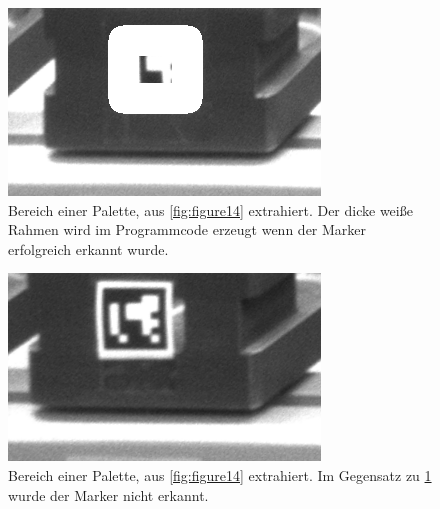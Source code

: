     \begin{figure}
        \caption[Bild aus der Lagerzelle nach der Rektifizierung und Zuschnitt auf einen Bereich einer Palette]
        {\small Bereich einer Palette, aus \ref{fig:figure14} extrahiert. Der dicke weiße Rahmen wird im Programmcode erzeugt wenn der Marker erfolgreich erkannt wurde. }\label{fig:figure16}
        \includegraphics[width = \textwidth/3]{Bilder/pallet_5.png}
        \centering
    \end{figure}

    \begin{figure}
        \caption[Bild aus der Lagerzelle nach der Rektifizierung und Zuschnitt auf einen Bereich einer Palette]
        {\small Bereich einer Palette, aus \ref{fig:figure14} extrahiert. Im Gegensatz zu \ref{fig:figure16} wurde der Marker nicht erkannt. }\label{fig:figure19}
        \includegraphics[width = \textwidth/3]{Bilder/pallet_3.png}
        \centering
    \end{figure}

